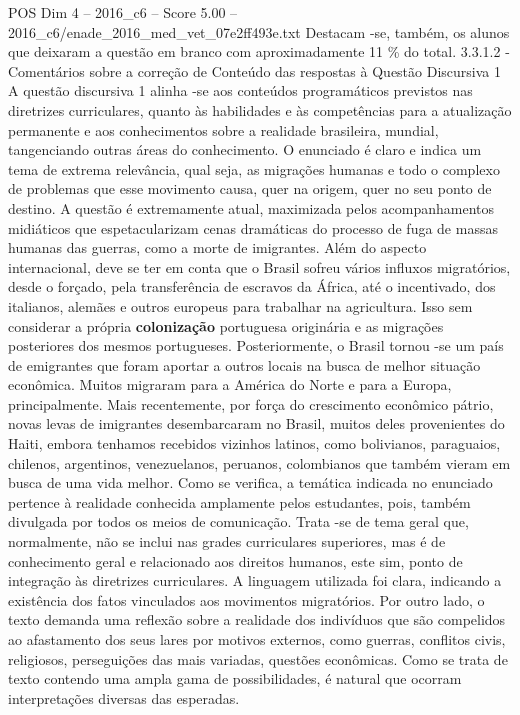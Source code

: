\begin{textsample}{POS Dim 4 – 2016\_c6 – Score 5.00 – 2016\_c6/enade\_2016\_med\_vet\_07e2ff493e.txt}
Destacam -se, também, os alunos que deixaram a questão em branco com aproximadamente 11 \% do total. 3.3.1.2 - Comentários sobre a correção de Conteúdo das respostas à Questão Discursiva 1 A questão discursiva 1 alinha -se aos conteúdos programáticos previstos nas diretrizes curriculares, quanto às habilidades e às competências para a atualização permanente e aos conhecimentos sobre a realidade brasileira, mundial, tangenciando outras áreas do conhecimento.
O enunciado é claro e indica um tema de extrema relevância, qual seja, as migrações humanas e todo o complexo de problemas que esse movimento causa, quer na origem, quer no seu ponto de destino.
A questão é extremamente atual, maximizada pelos acompanhamentos midiáticos que espetacularizam cenas dramáticas do processo de fuga de massas humanas das guerras, como a morte de imigrantes.
Além do aspecto internacional, deve se ter em conta que o Brasil sofreu vários influxos migratórios, desde o forçado, pela transferência de escravos da África, até o incentivado, dos italianos, alemães e outros europeus para trabalhar na agricultura.
Isso sem considerar a própria \textbf{colonização} portuguesa originária e as migrações posteriores dos mesmos portugueses.
Posteriormente, o Brasil tornou -se um país de emigrantes que foram aportar a outros locais na busca de melhor situação econômica.
Muitos migraram para a América do Norte e para a Europa, principalmente.
Mais recentemente, por força do crescimento econômico pátrio, novas levas de imigrantes desembarcaram no Brasil, muitos deles provenientes do Haiti, embora tenhamos recebidos vizinhos latinos, como bolivianos, paraguaios, chilenos, argentinos, venezuelanos, peruanos, colombianos que também vieram em busca de uma vida melhor.
Como se verifica, a temática indicada no enunciado pertence à realidade conhecida amplamente pelos estudantes, pois, também divulgada por todos os meios de comunicação.
Trata -se de tema geral que, normalmente, não se inclui nas grades curriculares superiores, mas é de conhecimento geral e relacionado aos direitos humanos, este sim, ponto de integração às diretrizes curriculares.
A linguagem utilizada foi clara, indicando a existência dos fatos vinculados aos movimentos migratórios.
Por outro lado, o texto demanda uma reflexão sobre a realidade dos indivíduos que são compelidos ao afastamento dos seus lares por motivos externos, como guerras, conflitos civis, religiosos, perseguições das mais variadas, questões econômicas.
Como se trata de texto contendo uma ampla gama de possibilidades, é natural que ocorram interpretações diversas das esperadas.

\end{textsample}

